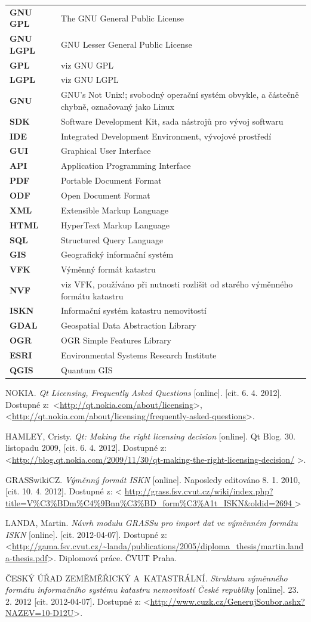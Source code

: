 \documentclass[a4paper,12pt]{article}
\newcommand{\radekZkr}[2]{\textbf{#1} & #2 \\}
\begin{document}
\begin{tabular}{p{}p{}}

\radekZkr{GNU GPL}{The GNU General Public License}
\radekZkr{GNU LGPL}{GNU Lesser General Public License}
\radekZkr{GPL}{viz GNU GPL}
\radekZkr{LGPL}{viz GNU LGPL}
\radekZkr{GNU}{GNU's Not Unix!; svobodný operační systém obvykle, a částečně chybně, označovaný jako Linux}

\radekZkr{SDK}{Software Development Kit, sada nástrojů pro vývoj softwaru}
\radekZkr{IDE}{Integrated Development Environment, vývojové prostředí}
\radekZkr{GUI}{Graphical User Interface}
\radekZkr{API}{Application Programming Interface}

\radekZkr{PDF}{Portable Document Format}
\radekZkr{ODF}{Open Document Format}
\radekZkr{XML}{Extensible Markup Language}
\radekZkr{HTML}{HyperText Markup Language}
\radekZkr{SQL}{Structured Query Language}

\radekZkr{GIS}{Geografický informační systém}

\radekZkr{VFK}{Výměnný formát katastru}
\radekZkr{NVF}{viz VFK, používáno při nutnosti rozlišit od starého výměnného formátu katastru}
\radekZkr{ISKN}{Informační systém katastru nemovitostí}

\radekZkr{GDAL}{Geospatial Data Abstraction Library}
\radekZkr{OGR}{OGR Simple Features Library}
\radekZkr{ESRI}{Environmental Systems Research Institute}
\radekZkr{QGIS}{Quantum GIS}

\end{tabular}

\newpage
\begin{thebibliography}{9}

NOKIA. \textit{Qt Licensing, Frequently Asked Questions} [online]. [cit. 6. 4. 2012].
Dostupné z:~\textless\url{http://qt.nokia.com/about/licensing}\textgreater, \textless\url{http://qt.nokia.com/about/licensing/frequently-asked-questions}\textgreater.

HAMLEY, Cristy. \textit{Qt: Making the right licensing decision} [online]. Qt Blog. 30. listopadu 2009, [cit. 6. 4. 2012]. Dostupné z: \textless\url{http://blog.qt.nokia.com/2009/11/30/qt-making-the-right-licensing-decision/} \textgreater.

GRASSwikiCZ. \textit{Výměnný formát ISKN} [online].
Naposledy editováno 8. 1. 2010, [cit. 10. 4. 2012]. Dostupné z: \textless
\url{
    http://grass.fsv.cvut.cz/wiki/index.php?title=V%
    } \textgreater

LANDA, Martin. \emph{Návrh modulu GRASSu pro import dat ve výměnném formátu ISKN} [online]. [cit. 2012-04-07]. Dostupné z: \textless\url{http://gama.fsv.cvut.cz/~landa/publications/2005/diploma_thesis/martin.landa-thesis.pdf}\textgreater. Diplomová práce. ČVUT Praha.

ČESKÝ ÚŘAD ZEMĚMĚŘICKÝ A~KATASTRÁLNÍ. \emph{Struktura výměnného formátu informačního systému katastru nemovitostí České republiky} [online]. 23. 2. 2012 [cit. 2012-04-07]. Dostupné z: \textless\url{http://www.cuzk.cz/GenerujSoubor.ashx?NAZEV=10-D12U}\textgreater.
    
    \end{thebibliography}
\end{document}
